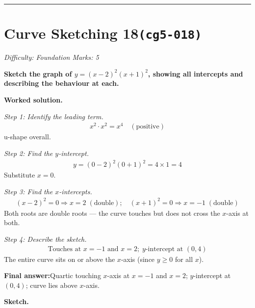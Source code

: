 \documentclass[11pt]{article}
\newcommand{\question}[1]{\par\medskip\noindent\textbf{#1}\par}
\begin{document}
\medskip\hrule

\section*{Curve Sketching 18\quad\small\texttt{(cg5-018)}}
\textit{Difficulty: Foundation \quad\textbar\quad Marks: 5}

\question{Sketch the graph of \( y = (x - 2)^2(x + 1)^2 \), showing all intercepts and describing the behaviour at each.}

\textbf{Worked solution.}

\textit{Step 1: Identify the leading term.}
\[\begin{gathered}
x^2 \cdot x^2 = x^4 \quad (\text{positive})
\end{gathered}\]
u-shape overall.

\textit{Step 2: Find the \( y \)-intercept.}
\[\begin{gathered}
y = (0-2)^2(0+1)^2 = 4 \times 1 = 4
\end{gathered}\]
Substitute \( x = 0 \).

\textit{Step 3: Find the \( x \)-intercepts.}
\[\begin{gathered}
(x-2)^2 = 0 \Rightarrow x = 2 \;(\text{double}); \quad (x+1)^2 = 0 \Rightarrow x = -1 \;(\text{double})
\end{gathered}\]
Both roots are double roots --- the curve touches but does not cross the \( x \)-axis at both.

\textit{Step 4: Describe the sketch.}
\[\begin{gathered}
\text{Touches at } x = -1 \text{ and } x = 2; \; y\text{-intercept at } (0, 4)
\end{gathered}\]
The entire curve sits on or above the \( x \)-axis (since \( y \geq 0 \) for all \( x \)).

\begin{answerbox}
\textbf{Final answer:}\quad Quartic touching \(\displaystyle x\)-axis at \(\displaystyle x = -1\) and \(\displaystyle x = 2\); \(\displaystyle y\)-intercept at \(\displaystyle (0, 4)\); curve lies above \(\displaystyle x\)-axis.
\end{answerbox}
\textbf{Sketch.}
\end{document}
